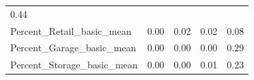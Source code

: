 \documentclass[]{article}
\begin{document}
\begin{longtable}[]{@{}lllll@{}}
\begin{minipage}[t]{0.11\columnwidth}
0.44\strut
\end{minipage}\tabularnewline
\begin{minipage}[t]{0.49\columnwidth}\raggedright\strut
Percent\_Retail\_basic\_mean\strut
\end{minipage} & \begin{minipage}[t]{0.08\columnwidth}\raggedright\strut
0.00\strut
\end{minipage} & \begin{minipage}[t]{0.09\columnwidth}\raggedright\strut
0.02\strut
\end{minipage} & \begin{minipage}[t]{0.09\columnwidth}\raggedright\strut
0.02\strut
\end{minipage} & \begin{minipage}[t]{0.11\columnwidth}\raggedright\strut
0.08\strut
\end{minipage}\tabularnewline
\begin{minipage}[t]{0.49\columnwidth}\raggedright\strut
Percent\_Garage\_basic\_mean\strut
\end{minipage} & \begin{minipage}[t]{0.08\columnwidth}\raggedright\strut
0.00\strut
\end{minipage} & \begin{minipage}[t]{0.09\columnwidth}\raggedright\strut
0.00\strut
\end{minipage} & \begin{minipage}[t]{0.09\columnwidth}\raggedright\strut
0.00\strut
\end{minipage} & \begin{minipage}[t]{0.11\columnwidth}\raggedright\strut
0.29\strut
\end{minipage}\tabularnewline
\begin{minipage}[t]{0.49\columnwidth}\raggedright\strut
Percent\_Storage\_basic\_mean\strut
\end{minipage} & \begin{minipage}[t]{0.08\columnwidth}\raggedright\strut
0.00\strut
\end{minipage} & \begin{minipage}[t]{0.09\columnwidth}\raggedright\strut
0.00\strut
\end{minipage} & \begin{minipage}[t]{0.09\columnwidth}\raggedright\strut
0.01\strut
\end{minipage} & \begin{minipage}[t]{0.11\columnwidth}\raggedright\strut
0.23\strut
\end{minipage}\tabularnewline

\end{longtable}
\end{document}
